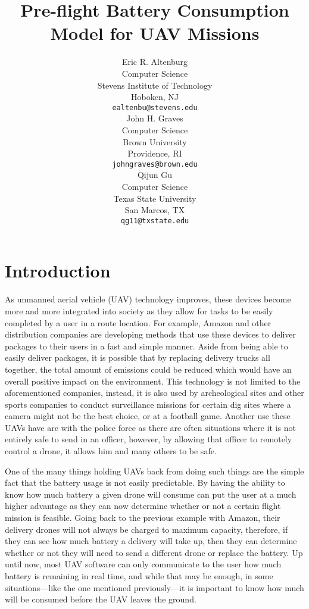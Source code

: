 \documentclass{article}
\title{Pre-flight Battery Consumption Model for UAV Missions}
\author{
  Eric R. Altenburg\\
  Computer Science\\
  Stevens Institute of Technology\\
  Hoboken, NJ \\
  \texttt{ealtenbu@stevens.edu}\\
   \And
  John H. Graves\\
  Computer Science\\
  Brown University\\
  Providence, RI \\
  \texttt{john\textunderscore graves@brown.edu} \\
  \And
  Qijun Gu\\
  Computer Science\\
  Texas State University\\
  San Marcos, TX \\
  \texttt{qg11@txstate.edu}\\
}
\begin{document}
\maketitle


\begin{abstract}
\lipsum[1]
\end{abstract}




\section{Introduction}
As unmanned aerial vehicle (UAV) technology improves, these devices become more and more integrated into society as they allow for tasks to be easily completed by a user in a route location. For example, Amazon and other distribution companies are developing methods that use these devices to deliver packages to their users in a fast and simple manner. Aside from being able to easily deliver packages, it is possible that by replacing delivery trucks all together, the total amount of emissions could be reduced which would have an overall positive impact on the environment. This technology is not limited to the aforementioned companies, instead, it is also used by archeological sites and other sports companies to conduct surveillance missions for certain dig sites where a camera might not be the best choice, or at a football game. Another use these UAVs have are with the police force as there are often situations where it is not entirely safe to send in an officer, however, by allowing that officer to remotely control a drone, it allows him and many others to be safe.\par

One of the many things holding UAVs back from doing such things are the simple fact that the battery usage is not easily predictable. By having the ability to know how much battery a given drone will consume can put the user at a much higher advantage as they can now determine whether or not a certain flight mission is feasible. Going back to the previous example with Amazon, their delivery drones will not always be charged to maximum capacity, therefore, if they can see how much battery a delivery will take up, then they can determine whether or not they will need to send a different drone or replace the battery. Up until now, most UAV software can only communicate to the user how much battery is remaining in real time, and while that may be enough, in some situations—like the one mentioned previously—it is important to know how much will be consumed before the UAV leaves the ground.\par
\end{document}
